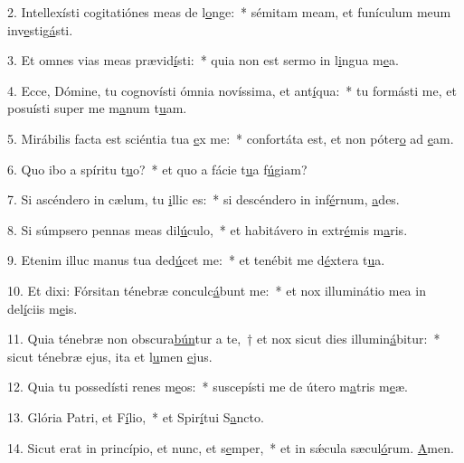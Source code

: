 2. Intellexísti cogitatiónes meas de l\uline{o}nge:~* sémitam meam, et funículum meum inv\uline{e}stig\uline{á}sti.\par 
3. Et omnes vias meas prævid\uline{í}sti:~* quia non est sermo in l\uline{i}ngua m\uline{e}a.\par 
4. Ecce, Dómine, tu cognovísti ómnia novíssima, et ant\uline{í}qua:~* tu formásti me, et posuísti super me m\uline{a}num t\uline{u}am.\par 
5. Mirábilis facta est sciéntia tua \uline{e}x me:~* confortáta est, et non póter\uline{o} ad \uline{e}am.\par 
6. Quo ibo a spíritu t\uline{u}o?~* et quo a fácie t\uline{u}a f\uline{ú}giam?\par 
7. Si ascéndero in cælum, tu \uline{i}llic es:~* si descéndero in inf\uline{é}rnum, \uline{a}des.\par 
8. Si súmpsero pennas meas dil\uline{ú}culo,~* et habitávero in extr\uline{é}mis m\uline{a}ris.\par 
9. Etenim illuc manus tua ded\uline{ú}cet me:~* et tenébit me d\uline{é}xtera t\uline{u}a.\par 
10. Et dixi: Fórsitan ténebræ conculc\uline{á}bunt me:~* et nox illuminátio mea in del\uline{í}ciis m\uline{e}is.\par 
11. Quia ténebræ non obscura\uline{bún}tur a te,~† et nox sicut dies illumin\uline{á}bitur:~* sicut ténebræ ejus, ita et l\uline{u}men \uline{e}jus.\par 
12. Quia tu possedísti renes m\uline{e}os:~* suscepísti me de útero m\uline{a}tris m\uline{e}æ.\par 
13. Glória Patri, et F\uline{í}lio,~* et Spir\uline{í}tui S\uline{a}ncto.\par 
14. Sicut erat in princípio, et nunc, et s\uline{e}mper,~* et in sǽcula sæcul\uline{ó}rum. \uline{A}men.\par 
